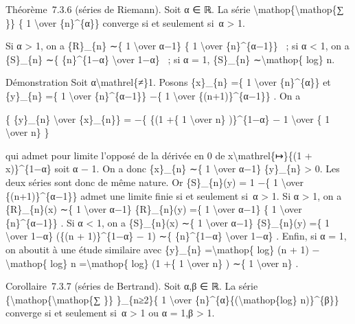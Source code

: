 \documentclass[]{article}
\begin{document}
Théorème~7.3.6 (séries de Riemann). Soit α ∈ ℝ. La série
\textbackslash{}mathop\{\textbackslash{}mathop\{∑ \}\} \{ 1
\textbackslash{}over \{n\}\^{}\{α\}\} converge si et seulement si~α
\textgreater{} 1.

Si α \textgreater{} 1, on a \{R\}\_\{n\} ∼\{ 1 \textbackslash{}over
α−1\} \{ 1 \textbackslash{}over \{n\}\^{}\{α−1\}\} ~; si α \textless{}
1, on a \{S\}\_\{n\} ∼\{ \{n\}\^{}\{1−α\} \textbackslash{}over 1−α\} ~;
si α = 1, \{S\}\_\{n\} ∼\textbackslash{}mathop\{ log\} n.

Démonstration Soit α\textbackslash{}mathrel\{≠\}1. Posons \{x\}\_\{n\}
=\{ 1 \textbackslash{}over \{n\}\^{}\{α\}\} et \{y\}\_\{n\} =\{ 1
\textbackslash{}over \{n\}\^{}\{α−1\}\} −\{ 1 \textbackslash{}over
\{(n+1)\}\^{}\{α−1\}\} . On a

\{ \{y\}\_\{n\} \textbackslash{}over \{x\}\_\{n\}\} = −\{ \{(1 +\{ 1
\textbackslash{}over n\} )\}\^{}\{1−α\} − 1 \textbackslash{}over \{ 1
\textbackslash{}over n\} \}

qui admet pour limite l'opposé de la dérivée en 0 de
x\textbackslash{}mathrel\{↦\}\{(1 + x)\}\^{}\{1−α\} soit α − 1. On a
donc \{x\}\_\{n\} ∼\{ 1 \textbackslash{}over α−1\} \{y\}\_\{n\}
\textgreater{} 0. Les deux séries sont donc de même nature. Or
\{S\}\_\{n\}(y) = 1 −\{ 1 \textbackslash{}over \{(n+1)\}\^{}\{α−1\}\}
admet une limite finie si et seulement si~α \textgreater{} 1. Si α
\textgreater{} 1, on a \{R\}\_\{n\}(x) ∼\{ 1 \textbackslash{}over α−1\}
\{R\}\_\{n\}(y) =\{ 1 \textbackslash{}over α−1\} \{ 1
\textbackslash{}over \{n\}\^{}\{α−1\}\} . Si α \textless{} 1, on a
\{S\}\_\{n\}(x) ∼\{ 1 \textbackslash{}over α−1\} \{S\}\_\{n\}(y) =\{ 1
\textbackslash{}over 1−α\} (\{(n + 1)\}\^{}\{1−α\} − 1) ∼\{
\{n\}\^{}\{1−α\} \textbackslash{}over 1−α\} . Enfin, si α = 1, on
aboutit à une étude similaire avec \{y\}\_\{n\}
=\textbackslash{}mathop\{ log\} (n + 1) −\textbackslash{}mathop\{ log\}
n =\textbackslash{}mathop\{ log\} (1 +\{ 1 \textbackslash{}over n\} )
∼\{ 1 \textbackslash{}over n\} .

Corollaire~7.3.7 (séries de Bertrand). Soit α,β ∈ ℝ. La série
\{\textbackslash{}mathop\{\textbackslash{}mathop\{∑ \}\} \}\_\{n≥2\}\{ 1
\textbackslash{}over \{n\}\^{}\{α\}\{(\textbackslash{}mathop\{log\}
n)\}\^{}\{β\}\} converge si et seulement si~α \textgreater{} 1 ou α =
1,β \textgreater{} 1.
\end{document}
